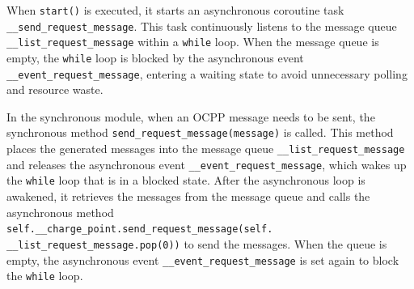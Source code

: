 \documentclass[
english,
ruledheaders=section,%
class=report,%
thesis={type=Report},%
accentcolor=9c,%
custommargins=true,%
marginpar=false,%
parskip=half-,%
fontsize=11pt,%
logofile={img/tuda_logo.pdf}, %
]{tudapub}
\begin{document}

    When \texttt{start()} is executed, it starts an asynchronous coroutine task\\\texttt{\_\_send\_request\_message}. This task continuously listens to the message queue\\\texttt{\_\_list\_request\_message} within a \texttt{while} loop. When the message queue is empty, the \texttt{while} loop is blocked by the asynchronous event \texttt{\_\_event\_request\_message}, entering a waiting state to avoid unnecessary polling and resource waste.


    In the synchronous module, when an OCPP message needs to be sent, the synchronous method \texttt{send\_request\_message(message)} is called. This method places the generated messages into the message queue \texttt{\_\_list\_request\_message} and releases the asynchronous event \texttt{\_\_event\_request\_message}, which wakes up the \texttt{while} loop that is in a blocked state. After the asynchronous loop is awakened, it retrieves the messages from the message queue and calls the asynchronous method\\\texttt{self.\_\_charge\_point.send\_request\_message(self.\\\_\_list\_request\_message.pop(0))} to send the messages. When the queue is empty, the asynchronous event \texttt{\_\_event\_request\_message} is set again to block the \texttt{while} loop.


\end{document}
